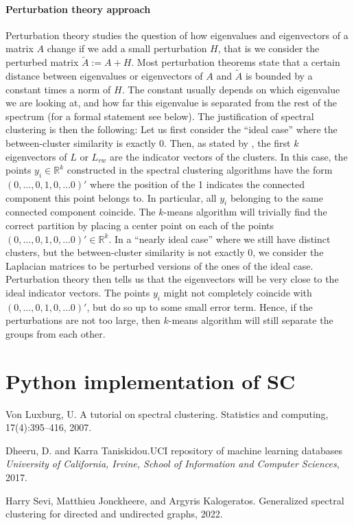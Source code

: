 \documentclass[a4paper,12pt]{article}
\theoremstyle{definition}
\theoremstyle{plain}
\def\R{\mathbb{R}}%
\begin{document}
\paragraph{Perturbation theory approach} 
Perturbation theory studies the question of how eigenvalues and
eigenvectors of a matrix $A$ change if we add a small perturbation
$H$, that is we consider the perturbed matrix $\tilde A := A + H$.
Most perturbation theorems state that a certain distance between
eigenvalues or eigenvectors of $A$ and $\tilde A$ is bounded by a
constant times a norm of $H$. The constant usually depends on which
eigenvalue we are looking at, and how far this eigenvalue is separated
from the rest of
the spectrum (for a formal statement see below). 
%
The justification of spectral clustering is then the following: Let us
first consider the ``ideal case'' where the between-cluster similarity
is exactly 0. Then, as stated by \cite{con_theo}, the first $k$ eigenvectors of $L$ or $L_{rw}$ are the indicator
vectors of the clusters. In this case, the points $y_i \in \R^k$
constructed in the spectral clustering algorithms have the form
$(0,\hdots,0,1,0,\hdots0)'$ where the position of the 1 indicates the
connected component this point belongs to. In particular, all $y_i$
belonging to the same connected component coincide. The $k$-means
algorithm will trivially find the correct partition by placing a
center point on each of the points $(0,\hdots,0,1,0,\hdots0)' \in
\R^k$.
%
In a ``nearly ideal case'' where we still have distinct clusters, but
the between-cluster similarity is not exactly 0, we consider the
Laplacian matrices to be perturbed versions of the ones of the ideal
case. Perturbation theory then tells us that the eigenvectors will be
very close to the ideal indicator vectors. The points $y_i$ might not
completely coincide with $(0,\hdots,0,1,0,\hdots0)'$, but do so up to
some small error term. Hence, if the perturbations are not too large,
then $k$-means algorithm will still separate the groups from each
other. \\

\section{Python implementation of SC}

\newpage
\begin{thebibliography}{9}
Von Luxburg, U. A tutorial on spectral clustering. Statistics and
computing, 17(4):395–416, 2007.

Dheeru, D. and Karra Taniskidou.UCI repository of machine learning databases \textit{University of California, Irvine, School of
	Information and Computer Sciences}, 2017.

Harry Sevi, Matthieu Jonckheere, and Argyris Kalogeratos.
Generalized spectral clustering for directed and undirected graphs,
2022.
\end{thebibliography}
\end{document}
